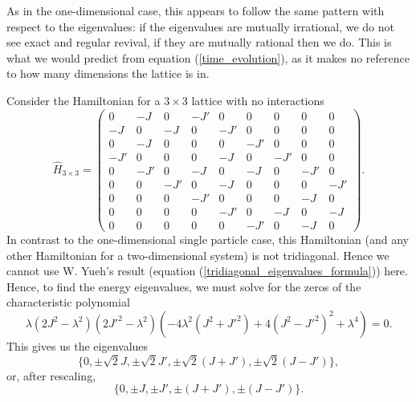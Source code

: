 \documentclass[a4paper, 10pt]{article}
\theoremstyle{plain}
\begin{document}
As in the one-dimensional case, this appears to follow the same pattern with
respect to the eigenvalues: if the eigenvalues are mutually irrational, we do
not see exact and regular revival, if they are mutually rational then we do.
This is what we would predict from equation (\ref{time_evolution}), as it makes
no reference to how many dimensions the lattice is in.

Consider the Hamiltonian for a $3\times3$ lattice with no interactions
\begin{equation}
    \hat{H}_{3\times3}
    =
    \begin{pmatrix}
         0  & -J  &  0  & -J' &  0  &  0  &  0  &  0  &  0  \\
        -J  &  0  & -J  &  0  & -J' &  0  &  0  &  0  &  0  \\
         0  & -J  &  0  &  0  &  0  & -J' &  0  &  0  &  0  \\
        -J' &  0  &  0  &  0  & -J  &  0  & -J' &  0  &  0  \\
         0  & -J' &  0  & -J  &  0  & -J  &  0  & -J' &  0  \\
         0  &  0  & -J' &  0  & -J  &  0  &  0  &  0  & -J' \\
         0  &  0  &  0  & -J' &  0  &  0  &  0  & -J  &  0  \\
         0  &  0  &  0  &  0  & -J' &  0  & -J  &  0  & -J  \\
         0  &  0  &  0  &  0  &  0  & -J' &  0  & -J  &  0
    \end{pmatrix}.
\end{equation}
In contrast to the one-dimensional single particle case, this Hamiltonian (and
any other Hamiltonian for a two-dimensional system) is not tridiagonal. Hence we cannot use
W. Yueh's result (equation (\ref{tridiagonal_eigenvalues_formula})) here.
Hence, to find the energy eigenvalues, we must solve for the zeros of the
characteristic polynomial
\begin{equation}
    \lambda \left ( 2 J^{2} - \lambda^{2} \right )
    \left ( 2 J'^{2} - \lambda^{2} \right )
    \left ( -4 \lambda^{2} \left ( J^{2} + J'^{2} \right )
    +
    4 \left ( J^{2} - J'^{2} \right )^{2}
    +
    \lambda^{4} \right )
    =
    0.
\end{equation}
This gives us the eigenvalues
\begin{equation*}
    \lbrace
        0, \pm\sqrt{2}J, \pm\sqrt{2}J', \pm \sqrt{2}(J+J'), \pm \sqrt{2}(J-J')
    \rbrace,
\end{equation*}
or, after rescaling,
\begin{equation*}
    \lbrace 0, \pm J, \pm J', \pm (J+J'), \pm (J-J') \rbrace.
\end{equation*}
\end{document}

